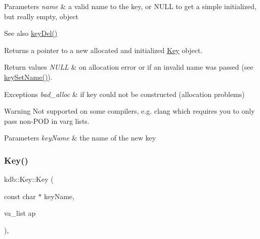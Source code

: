 \begin{DoxyParams}{Parameters}
{\em name} & a valid name to the key, or N\+U\+LL to get a simple initialized, but really empty, object \\
\hline
\end{DoxyParams}
\begin{DoxySeeAlso}{See also}
\mbox{\hyperlink{group__key_ga3df95bbc2494e3e6703ece5639be5bb1}{key\+Del()}} 
\end{DoxySeeAlso}
\begin{DoxyReturn}{Returns}
a pointer to a new allocated and initialized \mbox{\hyperlink{classkdb_1_1Key}{Key}} object. 
\end{DoxyReturn}

\begin{DoxyRetVals}{Return values}
{\em N\+U\+LL} & on allocation error or if an invalid {\ttfamily name} was passed (see \mbox{\hyperlink{group__keyname_ga7699091610e7f3f43d2949514a4b35d9}{key\+Set\+Name()}}).\\
\hline
\end{DoxyRetVals}

\begin{DoxyExceptions}{Exceptions}
{\em bad\+\_\+alloc} & if key could not be constructed (allocation problems)\\
\hline
\end{DoxyExceptions}
\begin{DoxyWarning}{Warning}
Not supported on some compilers, e.\+g. clang which requires you to only pass non-\/\+P\+OD in varg lists.
\end{DoxyWarning}

\begin{DoxyParams}{Parameters}
{\em key\+Name} & the name of the new key \\
\hline
\end{DoxyParams}
\mbox{\label{classkdb_1_1Key_aa0dc94c7e676a0d280e5817e4c6238d3}} 
\subsubsection{\texorpdfstring{Key()}{Key()}\hspace{0.1cm}{\footnotesize\ttfamily [7/7]}}
{\footnotesize\ttfamily kdb\+::\+Key\+::\+Key (\begin{DoxyParamCaption}\item[{const char $\ast$}]{key\+Name,  }\item[{va\+\_\+list}]{ap }\end{DoxyParamCaption})\hspace{0.3cm}{\ttfamily [inline]}, {\ttfamily [explicit]}}




